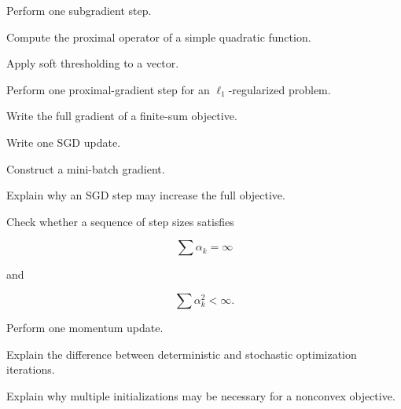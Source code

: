\begin{exercise}[3]
Perform one subgradient step.
\end{exercise}

\begin{exercise}[3]
Compute the proximal operator of a simple quadratic function.
\end{exercise}

\begin{exercise}[3]
Apply soft thresholding to a vector.
\end{exercise}

\begin{exercise}[3]
Perform one proximal-gradient step for an \(\ell_1\)-regularized problem.
\end{exercise}

\begin{exercise}[2]
Write the full gradient of a finite-sum objective.
\end{exercise}

\begin{exercise}[2]
Write one SGD update.
\end{exercise}

\begin{exercise}[3]
Construct a mini-batch gradient.
\end{exercise}

\begin{exercise}[3]
Explain why an SGD step may increase the full objective.
\end{exercise}

\begin{exercise}[3]
Check whether a sequence of step sizes satisfies

\[
\sum\alpha_k=\infty
\]

and

\[
\sum\alpha_k^2<\infty.
\]
\end{exercise}

\begin{exercise}[3]
Perform one momentum update.
\end{exercise}

\begin{exercise}[3]
Explain the difference between deterministic and stochastic optimization
iterations.
\end{exercise}

\begin{exercise}[3]
Explain why multiple initializations may be necessary for a nonconvex
objective.
\end{exercise}

